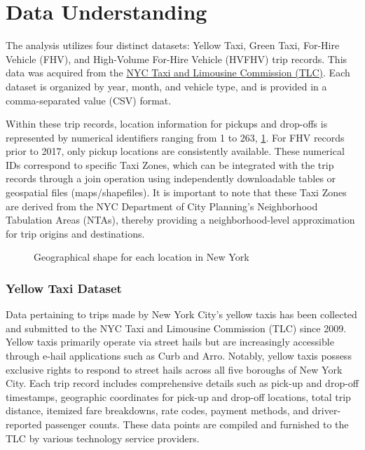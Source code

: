 \documentclass[conference]{IEEEtran}
\begin{document}

\section{Data Understanding}
The analysis utilizes four distinct datasets: Yellow Taxi, Green Taxi, For-Hire Vehicle (FHV), and High-Volume
For-Hire Vehicle (HVFHV) trip records. This data was acquired from the
\href{https://www.nyc.gov/site/tlc/about/tlc-trip-record-data.page}{NYC Taxi and Limousine Commission (TLC)}.
Each dataset is organized by year, month, and vehicle type, and is provided in a comma-separated value (CSV) format.

Within these trip records, location information for pickups and drop-offs is represented by numerical identifiers
ranging from 1 to 263, \ref{fig:nyc-zones-map}. For FHV records prior to 2017, only pickup locations are consistently
available. These numerical IDs correspond to specific Taxi Zones, which can be integrated with the trip records through
a join operation using independently downloadable tables or geospatial files (maps/shapefiles). It is important to note
that these Taxi Zones are derived from the NYC Department of City Planning's Neighborhood Tabulation Areas (NTAs),
thereby providing a neighborhood-level approximation for trip origins and destinations.

\begin{figure}[htbp]
  \label{fig:nyc-zones-map}
  \centering
  
  \caption{Geographical shape for each location in New York}
\end{figure}

\subsubsection*{Yellow Taxi Dataset}
Data pertaining to trips made by New York City's yellow taxis has been collected and submitted to the NYC Taxi and
Limousine Commission (TLC) since 2009. Yellow taxis primarily operate via street hails but are increasingly accessible
through e-hail applications such as Curb and Arro. Notably, yellow taxis possess exclusive rights to respond to street
hails across all five boroughs of New York City.
Each trip record includes comprehensive details such as pick-up and drop-off timestamps, geographic coordinates for
pick-up and drop-off locations, total trip distance, itemized fare breakdowns, rate codes, payment methods, and
driver-reported passenger counts. These data points are compiled and furnished to the TLC by various technology
service providers.
\end{document}
